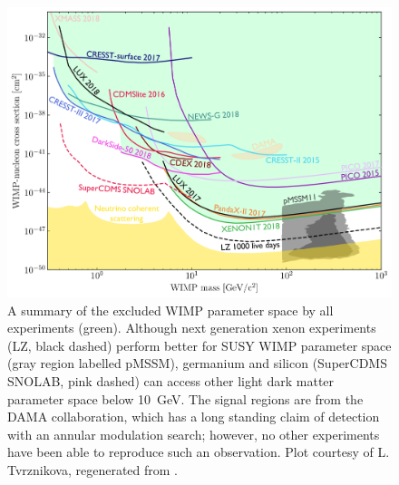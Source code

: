 \begin{figure}[htbp]
\begin{center}
\includegraphics[width=\textwidth]{figures/lxetpcs/limits_all.png}
\caption{A summary of the excluded \acs{WIMP} parameter space by all experiments (green). Although next generation xenon experiments (LZ, black dashed) perform better for \acs{SUSY} \acs{WIMP} parameter space (gray region labelled pMSSM), germanium and silicon (SuperCDMS SNOLAB, pink dashed) can access other light dark matter parameter space below 10~GeV. The signal regions are from the DAMA collaboration, which has a long standing claim of detection with an annular modulation search; however, no other experiments have been able to reproduce such an observation. Plot courtesy of L. Tvrznikova, regenerated from \cite{snowmass}. }
\label{fig:WIMPblobs}
\end{center}
\end{figure}



\FloatBarrier
